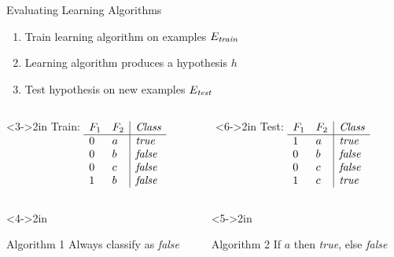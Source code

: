 \documentclass[14pt]{beamer}
\begin{document}
\begin{frame}{Evaluating Learning Algorithms}
\begin{enumerate}
\item Train learning algorithm on examples $E_{\textit{\scriptsize train}}$
\item Learning algorithm produces a hypothesis $h$
\item Test hypothesis on new examples $E_{\textit{\scriptsize test}}$ 
\end{enumerate}
\begin{columns}
\begin{column}<3->{2in}
Train:
$
\begin{array}[t]{ll|l}
F_1 & F_2 & \textit{Class} \\
\hline
0   & a   & \textit{true} \\
0   & b   & \textit{false} \\
0   & c   & \textit{false} \\
1   & b   & \textit{false} \\
\end{array}
$
\end{column}
\begin{column}<6->{2in}
Test:
$
\begin{array}[t]{ll|l}
F_1 & F_2 & \textit{Class} \\
\hline
1   & a   & \textit{true} \\
0   & b   & \textit{false} \\
0   & c   & \textit{false} \\
1   & c   & \textit{true} \\
\end{array}
$
\end{column}
\end{columns}
\begin{columns}
\begin{column}<4->{2in}
\begin{block}{Algorithm 1}
Always classify as \textit{false}
\\
 
\end{block}
\end{column}
\begin{column}<5->{2in}
\begin{block}{Algorithm 2}
If $a$ then \textit{true}, else \textit{false}
\\
 
\end{block}
\end{column}
\end{columns}
\end{frame}
\end{document}
